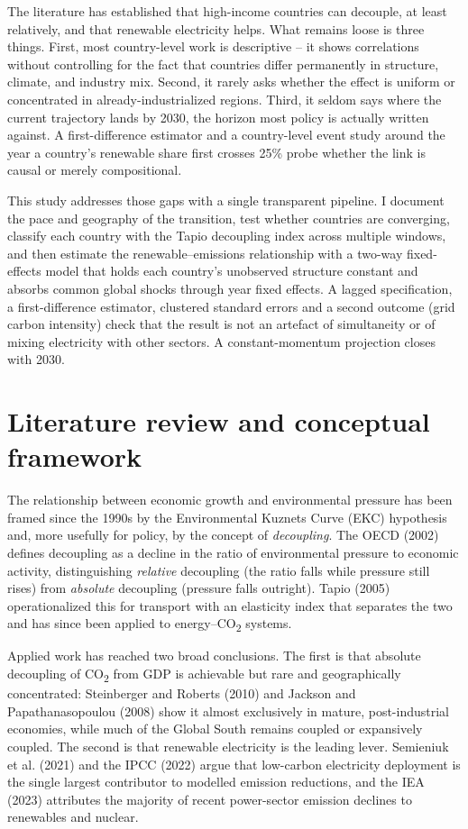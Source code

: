 \documentclass[11pt]{article}
\begin{document}
The literature has established that high-income countries can decouple, at least relatively, and that renewable electricity helps. What remains loose is three things. First, most country-level work is descriptive -- it shows correlations without controlling for the fact that countries differ permanently in structure, climate, and industry mix. Second, it rarely asks whether the effect is uniform or concentrated in already-industrialized regions. Third, it seldom says where the current trajectory lands by 2030, the horizon most policy is actually written against. A first-difference estimator and a country-level event study around the year a country's renewable share first crosses 25\% probe whether the link is causal or merely compositional.

This study addresses those gaps with a single transparent pipeline. I document the pace and geography of the transition, test whether countries are converging, classify each country with the Tapio decoupling index across multiple windows, and then estimate the renewable--emissions relationship with a two-way fixed-effects model that holds each country's unobserved structure constant and absorbs common global shocks through year fixed effects. A lagged specification, a first-difference estimator, clustered standard errors and a second outcome (grid carbon intensity) check that the result is not an artefact of simultaneity or of mixing electricity with other sectors. A constant-momentum projection closes with 2030.

\section{Literature review and conceptual framework}
The relationship between economic growth and environmental pressure has been framed since the 1990s by the Environmental Kuznets Curve (EKC) hypothesis and, more usefully for policy, by the concept of \emph{decoupling}. The OECD (2002) defines decoupling as a decline in the ratio of environmental pressure to economic activity, distinguishing \emph{relative} decoupling (the ratio falls while pressure still rises) from \emph{absolute} decoupling (pressure falls outright). Tapio (2005) operationalized this for transport with an elasticity index that separates the two and has since been applied to energy--CO\textsubscript{2} systems.

Applied work has reached two broad conclusions. The first is that absolute decoupling of CO\textsubscript{2} from GDP is achievable but rare and geographically concentrated: Steinberger and Roberts (2010) and Jackson and Papathanasopoulou (2008) show it almost exclusively in mature, post-industrial economies, while much of the Global South remains coupled or expansively coupled. The second is that renewable electricity is the leading lever. Semieniuk et al. (2021) and the IPCC (2022) argue that low-carbon electricity deployment is the single largest contributor to modelled emission reductions, and the IEA (2023) attributes the majority of recent power-sector emission declines to renewables and nuclear.
\end{document}
